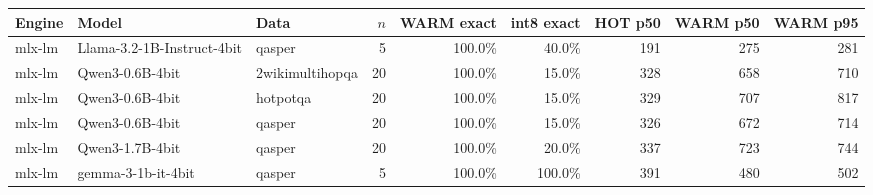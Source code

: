 \begin{tabular}{lllrrrrrr}
\toprule
Engine & Model & Data & $n$ & WARM exact & int8 exact & HOT p50 & WARM p50 & WARM p95 \\
\midrule
mlx-lm & Llama-3.2-1B-Instruct-4bit & qasper & 5 & 100.0\% & 40.0\% & 191 & 275 & 281 \\
mlx-lm & Qwen3-0.6B-4bit & 2wikimultihopqa & 20 & 100.0\% & 15.0\% & 328 & 658 & 710 \\
mlx-lm & Qwen3-0.6B-4bit & hotpotqa & 20 & 100.0\% & 15.0\% & 329 & 707 & 817 \\
mlx-lm & Qwen3-0.6B-4bit & qasper & 20 & 100.0\% & 15.0\% & 326 & 672 & 714 \\
mlx-lm & Qwen3-1.7B-4bit & qasper & 20 & 100.0\% & 20.0\% & 337 & 723 & 744 \\
mlx-lm & gemma-3-1b-it-4bit & qasper & 5 & 100.0\% & 100.0\% & 391 & 480 & 502 \\
\bottomrule
\end{tabular}
